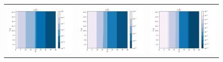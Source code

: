 \documentclass[a4,12pt]{article}
\begin{document}
\begin{itemize}
\begin{figure}[h]
\begin{tabular}{ccc}
 \includegraphics[scale=0.35]{figures/Figure_4.png} &
 \includegraphics[scale=0.35]{figures/Figure_5.png} &
 \includegraphics[scale=0.35]{figures/Figure_6.png}

\end{tabular}
\end{figure}
\end{itemize}
\end{document}
